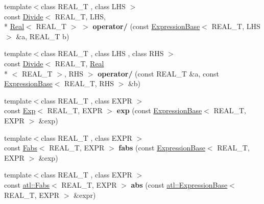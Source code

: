 \begin{DoxyCompactItemize}
\item 
\hypertarget{namespaceatl_ac3e1c031674bd9ff5518f1b4f83f834b}{{\footnotesize template$<$class R\+E\+A\+L\+\_\+\+T , class L\+H\+S $>$ }\\const \hyperlink{structatl_1_1_divide}{Divide}$<$ R\+E\+A\+L\+\_\+\+T, L\+H\+S, \\*
\hyperlink{structatl_1_1_real}{Real}$<$ R\+E\+A\+L\+\_\+\+T $>$ $>$ {\bfseries operator/} (const \hyperlink{structatl_1_1_expression_base}{Expression\+Base}$<$ R\+E\+A\+L\+\_\+\+T, L\+H\+S $>$ \&a, R\+E\+A\+L\+\_\+\+T b)}\label{namespaceatl_ac3e1c031674bd9ff5518f1b4f83f834b}

\item 
\hypertarget{namespaceatl_ade36cd574d2664715ec7281b26f5168c}{{\footnotesize template$<$class R\+E\+A\+L\+\_\+\+T , class L\+H\+S , class R\+H\+S $>$ }\\const \hyperlink{structatl_1_1_divide}{Divide}$<$ R\+E\+A\+L\+\_\+\+T, \hyperlink{structatl_1_1_real}{Real}\\*
$<$ R\+E\+A\+L\+\_\+\+T $>$, R\+H\+S $>$ {\bfseries operator/} (const R\+E\+A\+L\+\_\+\+T \&a, const \hyperlink{structatl_1_1_expression_base}{Expression\+Base}$<$ R\+E\+A\+L\+\_\+\+T, R\+H\+S $>$ \&b)}\label{namespaceatl_ade36cd574d2664715ec7281b26f5168c}

\item 
\hypertarget{namespaceatl_adf955d9d2f3f48ea2a0a72eadde4e43d}{{\footnotesize template$<$class R\+E\+A\+L\+\_\+\+T , class E\+X\+P\+R $>$ }\\const \hyperlink{structatl_1_1_exp}{Exp}$<$ R\+E\+A\+L\+\_\+\+T, E\+X\+P\+R $>$ {\bfseries exp} (const \hyperlink{structatl_1_1_expression_base}{Expression\+Base}$<$ R\+E\+A\+L\+\_\+\+T, E\+X\+P\+R $>$ \&exp)}\label{namespaceatl_adf955d9d2f3f48ea2a0a72eadde4e43d}

\item 
\hypertarget{namespaceatl_ad7abf8cbf92afaeafbdf21b7cdc380f0}{{\footnotesize template$<$class R\+E\+A\+L\+\_\+\+T , class E\+X\+P\+R $>$ }\\const \hyperlink{structatl_1_1_fabs}{Fabs}$<$ R\+E\+A\+L\+\_\+\+T, E\+X\+P\+R $>$ {\bfseries fabs} (const \hyperlink{structatl_1_1_expression_base}{Expression\+Base}$<$ R\+E\+A\+L\+\_\+\+T, E\+X\+P\+R $>$ \&exp)}\label{namespaceatl_ad7abf8cbf92afaeafbdf21b7cdc380f0}

\item 
\hypertarget{namespaceatl_a68f5173c03f979b4fa01d6c2eb96ac64}{{\footnotesize template$<$class R\+E\+A\+L\+\_\+\+T , class E\+X\+P\+R $>$ }\\const \hyperlink{structatl_1_1_fabs}{atl\+::\+Fabs}$<$ R\+E\+A\+L\+\_\+\+T, E\+X\+P\+R $>$ {\bfseries abs} (const \hyperlink{structatl_1_1_expression_base}{atl\+::\+Expression\+Base}$<$ R\+E\+A\+L\+\_\+\+T, E\+X\+P\+R $>$ \&expr)}\label{namespaceatl_a68f5173c03f979b4fa01d6c2eb96ac64}


\end{DoxyCompactItemize}
